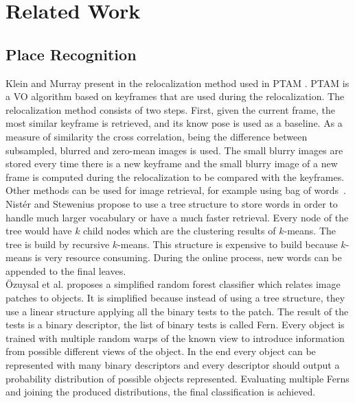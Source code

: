 \section{Related Work}\label{sec:related_work}

\subsection{Place Recognition}
\label{ssub:place_recognition}


Klein and Murray present in \cite{Klein2008improving} the relocalization method used in PTAM \cite{KleinMurray2007}. PTAM is a VO algorithm based on keyframes that are used during the relocalization. The relocalization method consists of two steps. First, given the current frame, the most similar keyframe is retrieved, and its know pose is used as a baseline. As a measure of similarity the cross correlation, being the difference between subsampled, blurred and zero-mean images is used. The small blurry images are stored every time there is a new keyframe and the small blurry image of a new frame is computed during the relocalization to be compared with the keyframes.\\

Other methods can be used for image retrieval, for example using bag of words~\cite{Sivic2003}. Nist\'er and Stewenius \cite{Nister2006} propose to use a tree structure to store words in order to handle much larger vocabulary or have a much faster retrieval. Every node of the tree would have $k$ child nodes which are the clustering results of $k$-means. The tree is build by recursive $k$-means. This structure is expensive to build because $k$-means is very resource consuming. During the online process, new words can be appended to the final leaves.\\

\"Ozuysal et al. \cite{Ozuysal2010} proposes a simplified random forest classifier which relates image patches to objects. It is simplified because instead of using a tree structure, they use a linear structure applying all the binary tests to the patch. The result of the tests is a binary descriptor, the list of binary tests is called Fern. Every object is trained with multiple random warps of the known view to introduce information from possible different views of the object. In the end every object can be represented with many binary descriptors and every descriptor should output a probability distribution of possible objects represented. Evaluating multiple Ferns and joining the produced distributions, the final classification is achieved.\\

